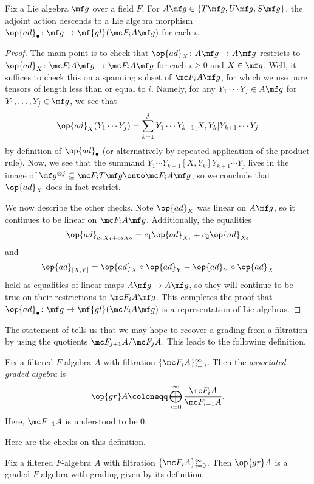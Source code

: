 \documentclass[../notes.tex]{subfiles}
\begin{document}
\begin{lemma}
	Fix a Lie algebra $\mf g$ over a field $F$. For $A\mf g\in\{T\mf g,U\mf g,S\mf g\}$, the adjoint action descends to a Lie algebra morphism $\op{ad}_\bullet\colon\mf g\to\mf{gl}(\mc F_iA\mf g)$ for each $i$.
\end{lemma}
\begin{proof}
	The main point is to check that $\op{ad}_X\colon A\mf g\to A\mf g$ restricts to $\op{ad}_X\colon\mc F_iA\mf g\to\mc F_iA\mf g$ for each $i\ge0$ and $X\in\mf g$. Well, it suffices to check this on a spanning subset of $\mc F_iA\mf g$, for which we use pure tensors of length less than or equal to $i$. Namely, for any $Y_1\cdots Y_j\in A\mf g$ for $Y_1,\ldots,Y_j\in\mf g$, we see that
	\[\op{ad}_X(Y_1\cdots Y_j) = \sum_{k=1}^jY_1\cdots Y_{k-1}[X,Y_k]Y_{k+1}\cdots Y_j\]
	by definition of $\op{ad}_\bullet$ (or alternatively by repeated application of the product rule). Now, we see that the summand $Y_1\cdots Y_{k-1}[X,Y_k]Y_{k+1}\cdots Y_j$ lives in the image of $\mf g^{\otimes j}\subseteq\mc F_i T\mf g\onto\mc F_i A\mf g$, so we conclude that $\op{ad}_X$ does in fact restrict.

	We now describe the other checks. Note $\op{ad}_X$ was linear on $A\mf g$, so it continues to be linear on $\mc F_iA\mf g$. Additionally, the equalities
	\[{\op{ad}_{c_1X_1+c_2X_2}}=c_1{\op{ad}_{X_1}}+c_2{\op{ad}_{X_2}}\]
	and
	\[{\op{ad}_{[X,Y]}}={\op{ad}_X}\circ{\op{ad}_Y}-{\op{ad}_Y}\circ{\op{ad}_X}\]
	held as equalities of linear maps $A\mf g\to A\mf g$, so they will continue to be true on their restrictions to $\mc F_iA\mf g$. This completes the proof that $\op{ad}_\bullet\colon\mf g\to\mf{gl}(\mc F_iA\mf g)$ is a representation of Lie algebras.
\end{proof}
The statement of  tells us that we may hope to recover a grading from a filtration by using the quotients $\mc F_{j+1}A/\mc F_jA$. This leads to the following definition.
\begin{definition}
	Fix a filtered $F$-algebra $A$ with filtration $\{\mc F_iA\}_{i=0}^\infty$. Then the \textit{associated graded algebra} is
	\[\op{gr}A\coloneqq\bigoplus_{i=0}^\infty\frac{\mc F_{i}A}{\mc F_{i-1}A}.\]
	Here, $\mc F_{-1}A$ is understood to be $0$.
\end{definition}
Here are the checks on this definition.
\begin{lemma}
	Fix a filtered $F$-algebra $A$ with filtration $\{\mc F_iA\}_{i=0}^\infty$. Then $\op{gr}A$ is a graded $F$-algebra with grading given by its definition.
\end{lemma}
\end{document}
